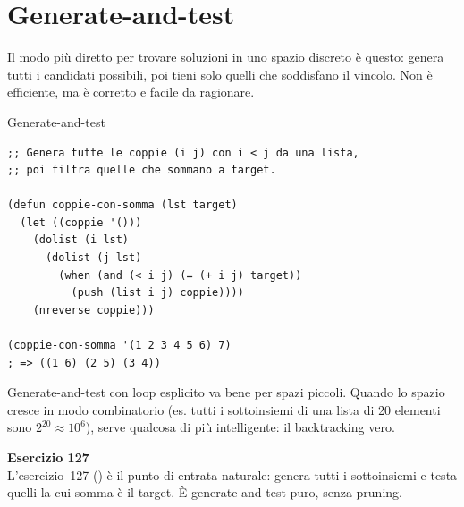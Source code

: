 \vspace{4pt}

\section{Generate-and-test}

Il modo più diretto per trovare soluzioni in uno spazio discreto
è questo: genera tutti i candidati possibili, poi tieni solo
quelli che soddisfano il vincolo.
Non è efficiente, ma è corretto e facile da ragionare.

\begin{concetto}{Generate-and-test}

\boxsep
{}
\end{concetto}

\begin{esempio}
\begin{lstlisting}
;; Genera tutte le coppie (i j) con i < j da una lista,
;; poi filtra quelle che sommano a target.

(defun coppie-con-somma (lst target)
  (let ((coppie '()))
    (dolist (i lst)
      (dolist (j lst)
        (when (and (< i j) (= (+ i j) target))
          (push (list i j) coppie))))
    (nreverse coppie)))

(coppie-con-somma '(1 2 3 4 5 6) 7)
; => ((1 6) (2 5) (3 4))
\end{lstlisting}
\end{esempio}

\begin{nota}
Generate-and-test con loop esplicito va bene per spazi piccoli.
Quando lo spazio cresce in modo combinatorio (es. tutti i sottoinsiemi
di una lista di 20 elementi sono $2^{20} \approx 10^6$), serve
qualcosa di più intelligente: il backtracking vero.
\end{nota}

\begin{workbook}
\textbf{Esercizio 127}\\[4pt]
L'esercizio~127 () è il punto di entrata naturale:
genera tutti i sottoinsiemi e testa quelli la cui somma è il target.
È generate-and-test puro, senza pruning.
\end{workbook}

